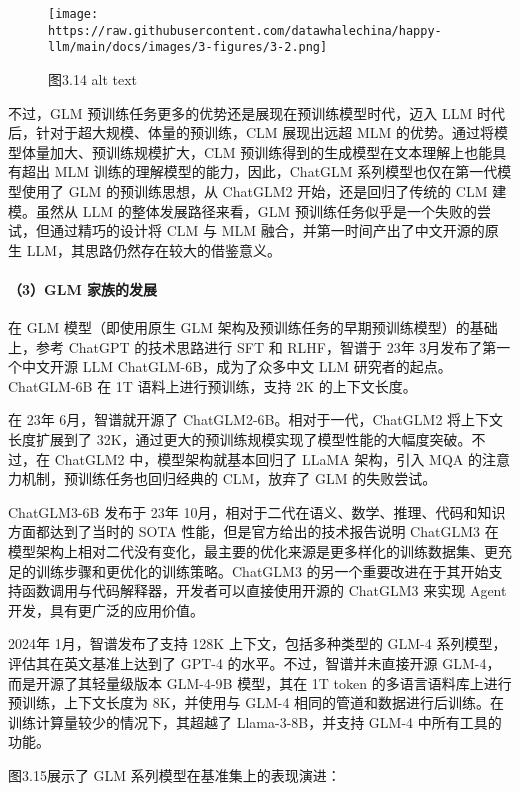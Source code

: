 \documentclass[12pt,a4paper]{book}
\begin{document}
\begin{figure}[htbp]\centering
\texttt{[image: https://raw.githubusercontent.com/datawhalechina/happy-llm/main/docs/images/3-figures/3-2.png]}
\caption{图3.14 alt text}
\end{figure}

不过，GLM 预训练任务更多的优势还是展现在预训练模型时代，迈入 LLM
时代后，针对于超大规模、体量的预训练，CLM 展现出远超 MLM
的优势。通过将模型体量加大、预训练规模扩大，CLM
预训练得到的生成模型在文本理解上也能具有超出 MLM
训练的理解模型的能力，因此，ChatGLM 系列模型也仅在第一代模型使用了 GLM
的预训练思想，从 ChatGLM2 开始，还是回归了传统的 CLM 建模。虽然从 LLM
的整体发展路径来看，GLM
预训练任务似乎是一个失败的尝试，但通过精巧的设计将 CLM 与 MLM
融合，并第一时间产出了中文开源的原生 LLM，其思路仍然存在较大的借鉴意义。

\paragraph{（3）GLM
家族的发展}\label{glm-ux5bb6ux65cfux7684ux53d1ux5c55}

在 GLM 模型（即使用原生 GLM
架构及预训练任务的早期预训练模型）的基础上，参考 ChatGPT 的技术思路进行
SFT 和 RLHF，智谱于 23年 3月发布了第一个中文开源 LLM
ChatGLM-6B，成为了众多中文 LLM 研究者的起点。ChatGLM-6B 在 1T
语料上进行预训练，支持 2K 的上下文长度。

在 23年 6月，智谱就开源了 ChatGLM2-6B。相对于一代，ChatGLM2
将上下文长度扩展到了
32K，通过更大的预训练规模实现了模型性能的大幅度突破。不过，在 ChatGLM2
中，模型架构就基本回归了 LLaMA 架构，引入 MQA
的注意力机制，预训练任务也回归经典的 CLM，放弃了 GLM 的失败尝试。

ChatGLM3-6B 发布于 23年
10月，相对于二代在语义、数学、推理、代码和知识方面都达到了当时的 SOTA
性能，但是官方给出的技术报告说明 ChatGLM3
在模型架构上相对二代没有变化，最主要的优化来源是更多样化的训练数据集、更充足的训练步骤和更优化的训练策略。ChatGLM3
的另一个重要改进在于其开始支持函数调用与代码解释器，开发者可以直接使用开源的
ChatGLM3 来实现 Agent 开发，具有更广泛的应用价值。

2024年 1月，智谱发布了支持 128K 上下文，包括多种类型的 GLM-4
系列模型，评估其在英文基准上达到了 GPT-4 的水平。不过，智谱并未直接开源
GLM-4，而是开源了其轻量级版本 GLM-4-9B 模型，其在 1T token
的多语言语料库上进行预训练，上下文长度为 8K，并使用与 GLM-4
相同的管道和数据进行后训练。在训练计算量较少的情况下，其超越了
Llama-3-8B，并支持 GLM-4 中所有工具的功能。

图3.15展示了 GLM 系列模型在基准集上的表现演进：
\end{document}
